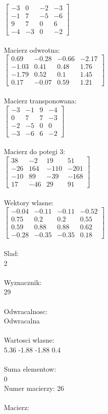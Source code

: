 \documentclass[a4paper,12pt]{article}
\begin{document}
$\begin{bmatrix} -3&0&-2&-3\\-1&7&-5&-6\\9&7&0&6\\-4&-3&0&-2 \end{bmatrix}$
\\
\\
Macierz odwrotna:\\

$\begin{bmatrix} 0.69&-0.28&-0.66&-2.17\\-1.03&0.41&0.48&1.76\\-1.79&0.52&0.1&1.45\\0.17&-0.07&0.59&1.21 \end{bmatrix}$
\\
\\
Macierz transponowana:\\

$\begin{bmatrix} -3&-1&9&-4\\0&7&7&-3\\-2&-5&0&0\\-3&-6&6&-2 \end{bmatrix}$
\\
\\
Macierz do potegi 3:\\

$\begin{bmatrix} 38&-2&19&51\\-26&164&-110&-201\\-10&89&-39&-168\\17&-46&29&91 \end{bmatrix}$
\\
\\
Wektory wlasne:\\

$\begin{bmatrix} -0.04&-0.11&-0.11&-0.52\\0.75&0.2&0.2&0.55\\0.59&0.88&0.88&0.62\\-0.28&-0.35&-0.35&0.18 \end{bmatrix}$
\\
\\
Slad:\\
2
\\
\\
Wyznacznik:\\
29
\\
\\
Odwracalnosc:\\
Odwracalna
\\
\\
Wartosci wlasne:\\
5.36 -1.88 -1.88 0.4
\\
\\
Suma elementow:\\
0
\\
\newpage
Numer macierzy:
26
\\
\\
Macierz:\\
\end{document}
